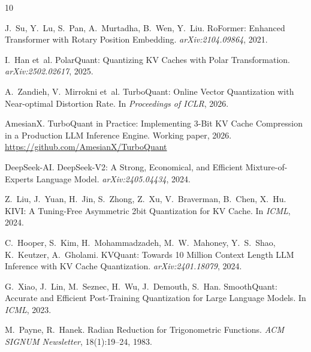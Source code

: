 \documentclass[10pt,twocolumn]{article}
\begin{document}

\begin{thebibliography}{10}

J.~Su, Y.~Lu, S.~Pan, A.~Murtadha, B.~Wen, Y.~Liu.
\newblock RoFormer: Enhanced Transformer with Rotary Position Embedding.
\newblock \emph{arXiv:2104.09864}, 2021.

I.~Han et~al.
\newblock PolarQuant: Quantizing KV Caches with Polar Transformation.
\newblock \emph{arXiv:2502.02617}, 2025.

A.~Zandieh, V.~Mirrokni et~al.
\newblock TurboQuant: Online Vector Quantization with Near-optimal Distortion Rate.
\newblock In \emph{Proceedings of ICLR}, 2026.

AmesianX.
\newblock TurboQuant in Practice: Implementing 3-Bit KV Cache Compression in a Production LLM Inference Engine.
\newblock Working paper, 2026.
\newblock \url{https://github.com/AmesianX/TurboQuant}

DeepSeek-AI.
\newblock DeepSeek-V2: A Strong, Economical, and Efficient Mixture-of-Experts Language Model.
\newblock \emph{arXiv:2405.04434}, 2024.

Z.~Liu, J.~Yuan, H.~Jin, S.~Zhong, Z.~Xu, V.~Braverman, B.~Chen, X.~Hu.
\newblock KIVI: A Tuning-Free Asymmetric 2bit Quantization for KV Cache.
\newblock In \emph{ICML}, 2024.

C.~Hooper, S.~Kim, H.~Mohammadzadeh, M.~W.~Mahoney, Y.~S.~Shao, K.~Keutzer, A.~Gholami.
\newblock KVQuant: Towards 10 Million Context Length LLM Inference with KV Cache Quantization.
\newblock \emph{arXiv:2401.18079}, 2024.

G.~Xiao, J.~Lin, M.~Seznec, H.~Wu, J.~Demouth, S.~Han.
\newblock SmoothQuant: Accurate and Efficient Post-Training Quantization for Large Language Models.
\newblock In \emph{ICML}, 2023.

M.~Payne, R.~Hanek.
\newblock Radian Reduction for Trigonometric Functions.
\newblock \emph{ACM SIGNUM Newsletter}, 18(1):19--24, 1983.

\end{thebibliography}
\end{document}
